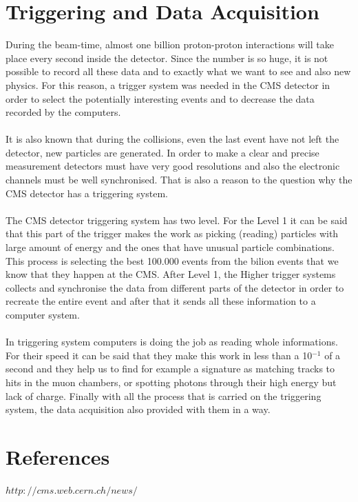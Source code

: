 \documentclass[a4paper,10pt]{article}
\begin{document}
\section{Triggering and Data Acquisition}

During the beam-time, almost one billion proton-proton interactions
will take place every second inside the detector. Since the number is so
huge, it is not possible to record all these data and to exactly what
we want to see and also new physics. For this reason, a trigger system was
needed in the CMS detector in order to select the potentially interesting
events and to decrease the data recorded by the computers.
\\\\
It is also known that during the collisions, even the last event have not
left the detector, new particles are generated. In order to make a clear
and precise measurement detectors must have very good resolutions and also
the electronic channels must be well synchronised. That is also a reason to the question 
why the CMS detector has a triggering system.
\\\\
The CMS detector triggering system has two level. For the Level 1
it can be said that this part of the trigger makes the work as picking
(reading) particles with large amount of energy and the ones that have unusual
particle combinations. This process is selecting the best 100.000 events
from the bilion events that we know that they happen at the CMS.
After Level 1, the Higher trigger systems collects and synchronise the
data from different parts of the detector in order to recreate the entire
event and after that it sends all these information to a computer system.
\\\\
In triggering system computers is doing the job as reading whole informations.
For their speed it can be said that they make this work in less than a 
10$^{-1}$ of a second and they help us to find for example a signature as
matching tracks to hits in the muon chambers, or spotting photons through their
high energy but lack of charge. Finally with all the process that is carried on
the triggering system, the data acquisition also provided with them in a way.

\clearpage
\section{References}
$http://cms.web.cern.ch/news/$
\end{document}
